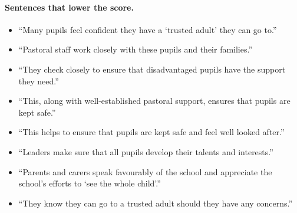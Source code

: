 \paragraph{Sentences that lower the score.}
\begin{itemize}
  \item ``Many pupils feel confident they have a `trusted adult' they can go to.''
  \item ``Pastoral staff work closely with these pupils and their families.''
  \item ``They check closely to ensure that disadvantaged pupils have the support they need.''
  \item ``This, along with well-established pastoral support, ensures that pupils are kept safe.''
  \item ``This helps to ensure that pupils are kept safe and feel well looked after.''
  \item ``Leaders make sure that all pupils develop their talents and interests.''
  \item ``Parents and carers speak favourably of the school and appreciate the school's efforts to `see the whole child'.''
  \item ``They know they can go to a trusted adult should they have any concerns.''
\end{itemize}
